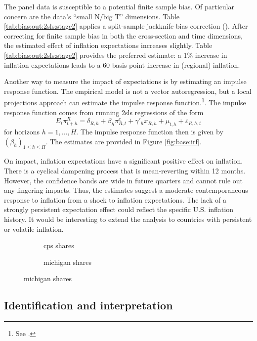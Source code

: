 \documentclass[12pt]{article}
\begin{document}
The panel data is susceptible to a potential finite sample bias. Of particular concern are the data's ``small N/big T'' dimensions. Table \ref{tab:bias:out:2sls:stage2} applies a split-sample jackknife bias correction (\cite{FernandezValWeidner:FE}). After correcting for finite sample bias in both the cross-section and time dimensions, the estimated effect of inflation expectations increases slightly. Table \ref{tab:bias:out:2sls:stage2} provides the preferred estimate: a 1\% increase in inflation expectations leads to a 60 basis point increase in (regional) inflation.



Another way to measure the impact of expectations is by estimating an impulse response function. The empirical model is not a vector autoregression, but a local projections approach can estimate the impulse response function.\footnote{See \cite{Jorda:LP}.}. The impulse response function comes from running 2sls regressions of the form
$$ E_t\pi^R_{t+h} = \delta_{R,h} + \beta_h\pi^e_{R,t} + \gamma'_h x_{R,h} + \mu_{t,h} + \varepsilon_{R,h,t}$$
for horizons $h=1,...,H$. The impulse response function then is given by $\left(\beta_h\right)_{1\leq h\leq H}$. The estimates are provided in Figure \ref{fig:base:irf}.

On impact, inflation expectations have a significant positive effect on inflation. There is a cyclical dampening process that is mean-reverting within 12 months. However, the confidence bands are wide in future quarters and cannot rule out any lingering impacts. Thus, the estimates suggest a moderate contemporaneous response to inflation from a shock to inflation expectations. The lack of a strongly persistent expectation effect could reflect the specific U.S. inflation history. It would be interesting to extend the analysis to countries with persistent or volatile inflation.


\begin{figure}
\centering
\caption{Impulse responses}\label{fig:base:irf}
\begin{subfigure}[t]{0.475\textwidth}
\centering

\caption{cps shares}
\end{subfigure}
\quad
\begin{subfigure}[t]{0.475\textwidth}
\centering

\caption{michigan shares}
\end{subfigure}
\end{figure}

\subsection{Identification and interpretation}
\end{document}

